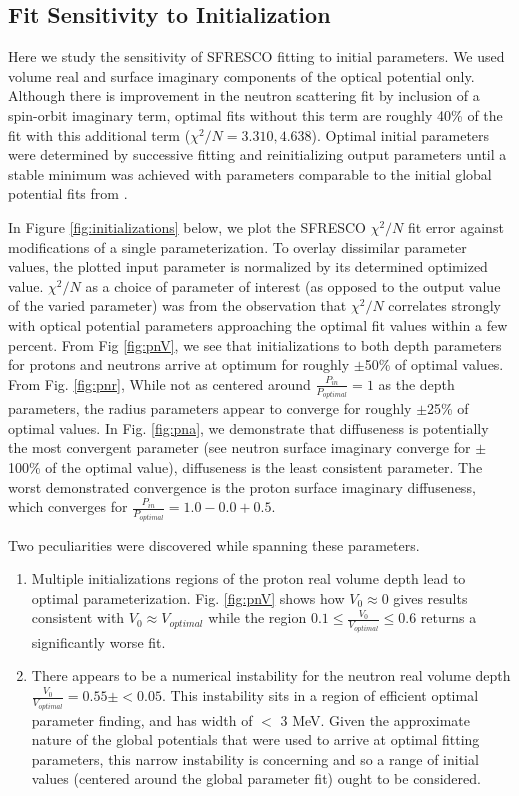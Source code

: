 \subsection{Fit Sensitivity to Initialization}
Here we study the sensitivity of SFRESCO fitting to initial parameters. We used volume real and surface imaginary components of the optical potential only. Although there is improvement in the neutron scattering fit by inclusion of a spin-orbit imaginary term, optimal fits without this term are roughly 40\% of the fit with this additional term ($\chi^2/N = 3.310, 4.638 $). Optimal initial parameters were determined by successive fitting and reinitializing output parameters until a stable minimum was achieved with parameters comparable to the initial global potential fits from \cite{capote2009ripl}.
\par
In Figure \ref{fig:initializations} below, we plot the SFRESCO $\chi^2/N$ fit error against modifications of a single parameterization. To overlay dissimilar parameter values, the plotted input parameter is normalized by its determined optimized value. $\chi^2/N$ as a choice of parameter of interest (as opposed to the output value of the varied parameter) was from the observation that  $\chi^2/N$ correlates strongly with optical potential parameters approaching the optimal fit values within a few percent. From Fig \ref{fig:pnV}, we see that initializations to both depth parameters for protons and neutrons arrive at optimum for roughly $\pm$50\% of optimal values. From Fig. \ref{fig:pnr}, While not as centered around $\frac{P_{in}}{P_{optimal}}=1$ as the depth parameters, the radius parameters appear to converge for roughly $\pm$25\% of optimal values. In Fig. \ref{fig:pna}, we demonstrate that diffuseness is potentially the most convergent parameter (see neutron surface imaginary converge for $\pm$100\% of the optimal value), diffuseness is the least consistent parameter. The worst demonstrated convergence is the proton surface imaginary diffuseness, which converges for $\frac{P_{in}}{P_{optimal}}=1.0-0.0+0.5$.
\par
Two peculiarities were discovered while spanning these parameters.
\begin{enumerate}
	\item Multiple initializations regions of the proton real volume depth lead to optimal parameterization. Fig. \ref{fig:pnV} shows how $V_0\approx 0$ gives results consistent with $V_0 \approx V_{optimal}$ while the region $0.1 \leq \frac{V_0}{V_{optimal}} \leq 0.6$ returns a significantly worse fit.
	\item There appears to be a numerical instability for the neutron real volume depth $\frac{V_0}{V_{optimal}} = 0.55 \pm <0.05$. This instability sits in a region of efficient optimal parameter finding, and has width of $<$ 3 MeV. Given the approximate nature of the global potentials that were used to arrive at optimal fitting parameters, this narrow instability is concerning and so a range of initial values (centered around the global parameter fit) ought to be considered. 
\end{enumerate}
